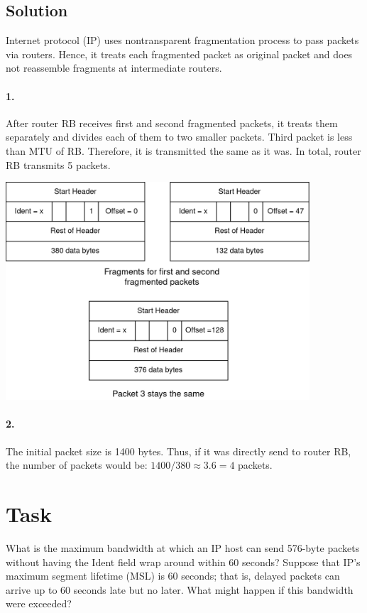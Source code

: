 \documentclass[11pt]{article}
\begin{document}
    \newpage

    \subsection{Solution}
    Internet protocol (IP) uses nontransparent fragmentation process to pass packets via routers.
    Hence, it treats each fragmented packet as original packet and does not reassemble fragments at intermediate routers.

    \paragraph{1.} After router RB receives first and second fragmented packets, it treats them separately and
    divides each of them to two smaller packets.
    Third packet is less than MTU of RB. Therefore, it is transmitted the same as it was.
    In total, router RB transmits 5 packets.

    \begin{center}
        \includegraphics[width=0.85\textwidth]{figs/Sol4-1}
    \end{center}

    \paragraph{2.}
    The initial packet size is 1400 bytes.
    Thus, if it was directly send to router RB, the number of packets would be:
    $1400/380 \approx 3.6 = 4$ packets.
    \newpage


    \section{Task}\label{sec:task-5}
    What is the maximum bandwidth at which an IP host can send 576-byte packets
    without having the Ident field wrap around within 60 seconds?
    Suppose that IP’s maximum segment lifetime (MSL) is 60 seconds;
    that is, delayed packets can arrive up to 60 seconds late but no later.
    What might happen if this bandwidth were exceeded?
\end{document}
